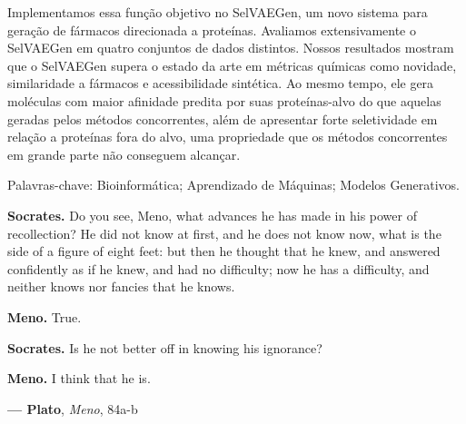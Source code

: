 \documentclass[a4paper,12pt]{article}
\begin{document}
Implementamos essa função objetivo no SelVAEGen, um novo sistema para geração de fármacos direcionada a proteínas. Avaliamos extensivamente o SelVAEGen em quatro conjuntos de dados distintos. Nossos resultados mostram que o SelVAEGen supera o estado da arte em métricas químicas como novidade, similaridade a fármacos e acessibilidade sintética. Ao mesmo tempo, ele gera moléculas com maior afinidade predita por suas proteínas-alvo do que aquelas geradas pelos métodos concorrentes, além de apresentar forte seletividade em relação a proteínas fora do alvo, uma propriedade que os métodos concorrentes em grande parte não conseguem alcançar.

Palavras-chave: Bioinformática; Aprendizado de Máquinas; Modelos Generativos.
\thispagestyle{empty}

\newpage
\thispagestyle{empty}

\null\vfill

\begin{flushright}
    \parbox{10cm}{
        \itshape

        \textbf{Socrates.} Do you see, Meno, what advances he has made in his power of recollection? He did not know at first, and he does not know now, what is the side of a figure of eight feet: but then he thought that he knew, and answered confidently as if he knew, and had no difficulty; now he has a difficulty, and neither knows nor fancies that he knows.

        \medskip

        \textbf{Meno.} True.

        \medskip

        \textbf{Socrates.} Is he not better off in knowing his ignorance?

        \medskip

        \textbf{Meno.} I think that he is.

        \vspace{0.6cm}

        \raggedleft
        \upshape
        \textbf{--- Plato}, \textit{Meno}, 84a-b\footnotemark
    }
\end{flushright}

\end{document}
